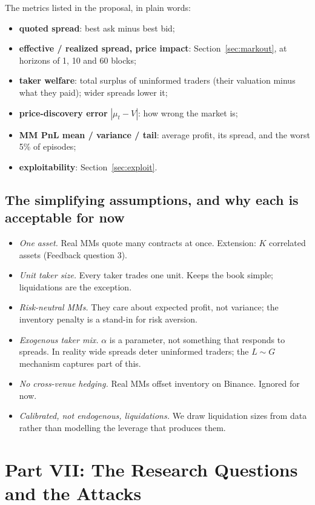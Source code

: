 \documentclass[11pt]{article}
\begin{document}
The metrics listed in the proposal, in plain words:
\begin{itemize}
\item \textbf{quoted spread}: best ask minus best bid;
\item \textbf{effective / realized spread, price impact}: Section~\ref{sec:markout}, at horizons of 1, 10 and 60 blocks;
\item \textbf{taker welfare}: total surplus of uninformed traders (their valuation minus what they paid); wider spreads lower it;
\item \textbf{price-discovery error} $|\mu_t-V|$: how wrong the market is;
\item \textbf{MM PnL mean / variance / tail}: average profit, its spread, and the worst 5\% of episodes;
\item \textbf{exploitability}: Section~\ref{sec:exploit}.
\end{itemize}

\subsection{The simplifying assumptions, and why each is acceptable for now}
\begin{itemize}
\item \emph{One asset.} Real MMs quote many contracts at once. Extension: $K$ correlated assets (Feedback question 3).
\item \emph{Unit taker size.} Every taker trades one unit. Keeps the book simple; liquidations are the exception.
\item \emph{Risk-neutral MMs.} They care about expected profit, not variance; the inventory penalty is a stand-in for risk aversion.
\item \emph{Exogenous taker mix.} $\alpha$ is a parameter, not something that responds to spreads. In reality wide spreads deter uninformed traders; the $L\sim G$ mechanism captures part of this.
\item \emph{No cross-venue hedging.} Real MMs offset inventory on Binance. Ignored for now.
\item \emph{Calibrated, not endogenous, liquidations.} We draw liquidation sizes from data rather than modelling the leverage that produces them.
\end{itemize}

\section{Part VII: The Research Questions and the Attacks}
\end{document}
